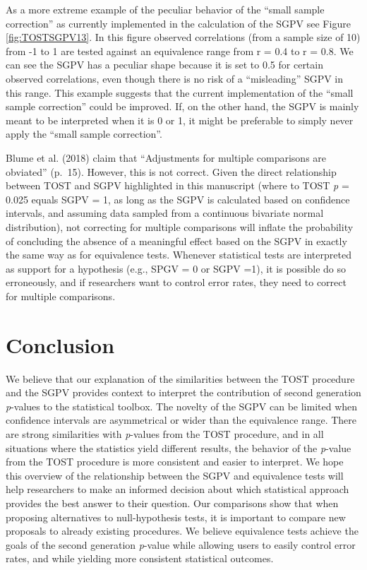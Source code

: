 \documentclass[,man,floatsintext]{apa6}
\begin{document}
As a more extreme example of the peculiar behavior of the \enquote{small
sample correction} as currently implemented in the calculation of the
SGPV see Figure \ref{fig:TOSTSGPV13}. In this figure observed
correlations (from a sample size of 10) from -1 to 1 are tested against
an equivalence range from r = 0.4 to r = 0.8. We can see the SGPV has a
peculiar shape because it is set to 0.5 for certain observed
correlations, even though there is no risk of a \enquote{misleading}
SGPV in this range. This example suggests that the current
implementation of the \enquote{small sample correction} could be
improved. If, on the other hand, the SGPV is mainly meant to be
interpreted when it is 0 or 1, it might be preferable to simply never
apply the \enquote{small sample correction}.

Blume et al. (2018) claim that \enquote{Adjustments for multiple
comparisons are obviated} (p.~15). However, this is not correct. Given
the direct relationship between TOST and SGPV highlighted in this
manuscript (where to TOST \emph{p} = 0.025 equals SGPV = 1, as long as
the SGPV is calculated based on confidence intervals, and assuming data
sampled from a continuous bivariate normal distribution), not correcting
for multiple comparisons will inflate the probability of concluding the
absence of a meaningful effect based on the SGPV in exactly the same way
as for equivalence tests. Whenever statistical tests are interpreted as
support for a hypothesis (e.g., SPGV = 0 or SGPV =1), it is possible do
so erroneously, and if researchers want to control error rates, they
need to correct for multiple comparisons.

\section{Conclusion}\label{conclusion}

We believe that our explanation of the similarities between the TOST
procedure and the SGPV provides context to interpret the contribution of
second generation \emph{p}-values to the statistical toolbox. The
novelty of the SGPV can be limited when confidence intervals are
asymmetrical or wider than the equivalence range. There are strong
similarities with \emph{p}-values from the TOST procedure, and in all
situations where the statistics yield different results, the behavior of
the \emph{p}-value from the TOST procedure is more consistent and easier
to interpret. We hope this overview of the relationship between the SGPV
and equivalence tests will help researchers to make an informed decision
about which statistical approach provides the best answer to their
question. Our comparisons show that when proposing alternatives to
null-hypothesis tests, it is important to compare new proposals to
already existing procedures. We believe equivalence tests achieve the
goals of the second generation \emph{p}-value while allowing users to
easily control error rates, and while yielding more consistent
statistical outcomes.
\end{document}
